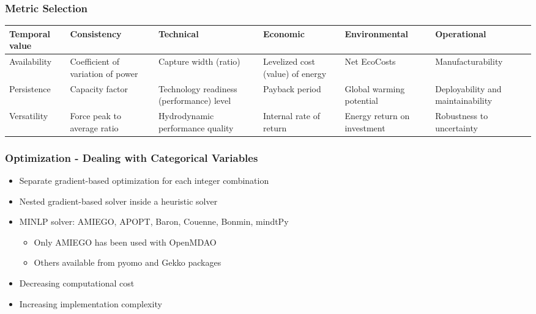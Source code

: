 \begin{frame}
	\frametitle{Metric Selection}
	\begin{tabular}{|l|l|l|l|l|l|} \hline
		Temporal value & Consistency                       & Technical                                & Economic                         & Environmental               & Operational                       \\ \hline
		Availability   & Coefficient of variation of power & Capture width (ratio)                    & Levelized cost (value) of energy & Net EcoCosts                & Manufacturability                 \\ \hline
		Persistence    & Capacity factor                   & Technology readiness (performance) level & Payback period                   & Global warming potential    & Deployability and maintainability \\ \hline
		Versatility    & Force peak to average ratio       & Hydrodynamic performance quality         & Internal rate of return          & Energy return on investment & Robustness to uncertainty         \\ \hline
	\end{tabular}
	
	
\end{frame}


\begin{frame}
	\frametitle{Optimization - Dealing with Categorical Variables}
	\begin{itemize}
		\item Separate gradient-based optimization for each integer combination
		\item Nested gradient-based solver inside a heuristic solver
		\item MINLP solver: AMIEGO, APOPT, Baron, Couenne, Bonmin, mindtPy
		      \begin{itemize}
		      	\item Only AMIEGO has been used with OpenMDAO
		      	\item Others available from pyomo and Gekko packages
		      \end{itemize}
		      
		\item Decreasing computational cost
		\item Increasing implementation complexity
	\end{itemize}
	
\end{frame}


